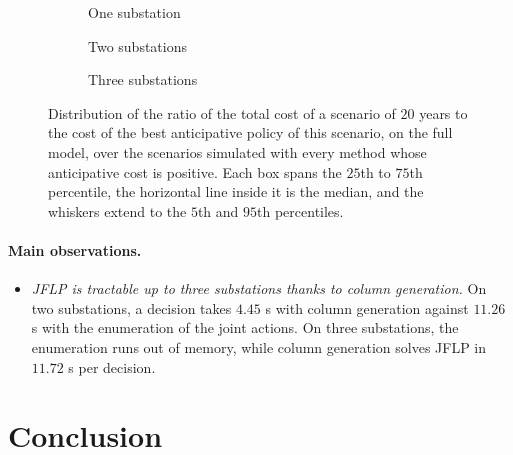 \documentclass{article}
\begin{document}
\begin{figure}[H]
\centering
{}
\begin{subfigure}[b]{0.325\textwidth}
\centering

\caption{One substation}
\end{subfigure}
\hfill
\begin{subfigure}[b]{0.325\textwidth}
\centering

\caption{Two substations}
\end{subfigure}
\hfill
\begin{subfigure}[b]{0.325\textwidth}
\centering

\caption{Three substations}
\end{subfigure}
\caption{Distribution of the ratio of the total cost of a scenario of $20$ years to the cost of the best anticipative
policy of this scenario, on the full model, over the scenarios simulated with every method whose anticipative cost is
positive. Each box spans the $25$th to $75$th percentile, the horizontal line inside it is the median, and
the whiskers extend to the $5$th and $95$th percentiles.}
\label{fig:boxplot-one-substation}
\end{figure}

\paragraph{Main observations.}
\begin{itemize}
\item \emph{JFLP is tractable up to three substations thanks to column generation.} On two substations,
a decision takes $4.45$ s with column generation against $11.26$ s with the enumeration of the joint actions. On
three substations, the enumeration runs out of memory, while column generation solves JFLP in
$11.72$ s per decision.
\end{itemize}

\section{Conclusion}
\end{document}
